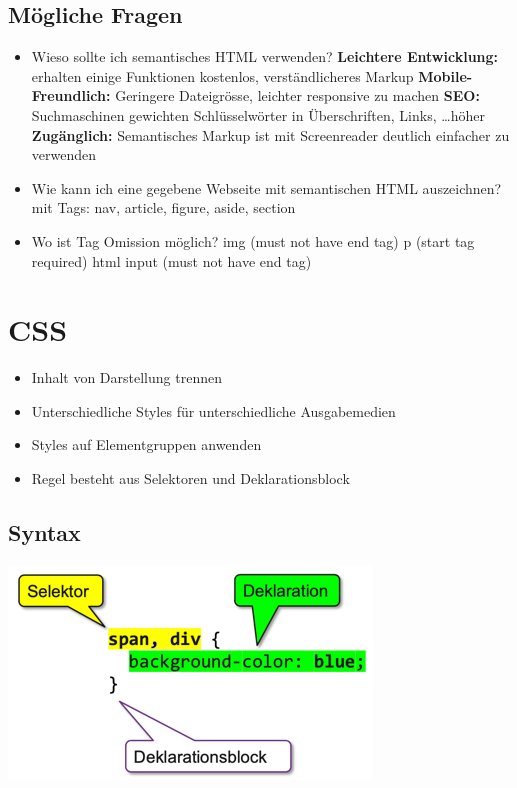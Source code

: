 \documentclass[a4paper, landscape, 8pt]{scrartcl}
\begin{document}
\begin{multicols*}{4}
        \subsection{\textbf{Mögliche Fragen}}
        \begin{itemize}
            \item Wieso sollte ich semantisches HTML verwenden?
            \subitem \textbf{Leichtere Entwicklung:} erhalten einige Funktionen kostenlos, verständlicheres Markup
            \subitem \textbf{Mobile-Freundlich:} Geringere Dateigrösse, leichter responsive zu machen
            \subitem \textbf{SEO:} Suchmaschinen gewichten Schlüsselwörter in Überschriften, Links, \ldots höher
            \subitem \textbf{Zugänglich:} Semantisches Markup ist mit Screenreader deutlich einfacher zu verwenden
            \item Wie kann ich eine gegebene Webseite mit semantischen HTML auszeichnen?
            \subitem mit Tags: nav, article, figure, aside, section
            \item Wo ist Tag Omission möglich?
            \subitem img (must not have end tag)
            \subitem p (start tag required)
            \subitem html
            \subitem input (must not have end tag)
        \end{itemize}

        \section{CSS}
        \begin{itemize}
            \item Inhalt von Darstellung trennen
            \item Unterschiedliche Styles für unterschiedliche Ausgabemedien
            \item Styles auf Elementgruppen anwenden
            \item Regel besteht aus Selektoren und Deklarationsblock
        \end{itemize}

        \subsection{Syntax}
        \includegraphics[scale=0.2]{graphic/28-css-syntax}


\end{multicols*}
\end{document}
